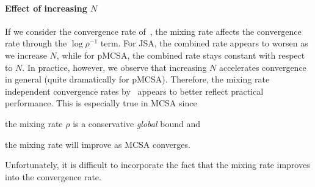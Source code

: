 \paragraph{Effect of increasing \(N\)}
If we consider the convergence rate of~\citet{duchi_ergodic_2012}, the mixing rate affects the convergence rate through the \(\log \rho^{-1}\) term.
For JSA, the combined rate appears to worsen as we increase \(N\), while for pMCSA, the combined rate stays constant with respect to \(N\).
In practice, however, we observe that increasing \(N\) accelerates convergence in general (quite dramatically for pMCSA).
Therefore, the mixing rate independent convergence rates by~\citet{doan_finitetime_2020, doan_convergence_2020} appears to better reflect practical performance.
This is especially true in MCSA since
\begin{enumerate*}[label=\textbf{(\roman*)}]
  \item the mixing rate \(\rho\) is a conservative \textit{global} bound and 
  \item the mixing rate will improve as MCSA converges.
\end{enumerate*}
Unfortunately, it is difficult to incorporate the fact that the mixing rate improves into the convergence rate.


